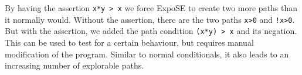 By having the assertion \lstinline{x*y > x} we force ExpoSE to create two more paths than it normally would. Without the assertion, there are the two paths \lstinline{x>0} and \lstinline{!x>0}. But with the assertion, we added the path condition \lstinline{(x*y) > x} and its negation. This can be used to test for a certain behaviour, but requires manual modification of the program. Similar to normal conditionals, it also leads to an increasing number of explorable paths.
